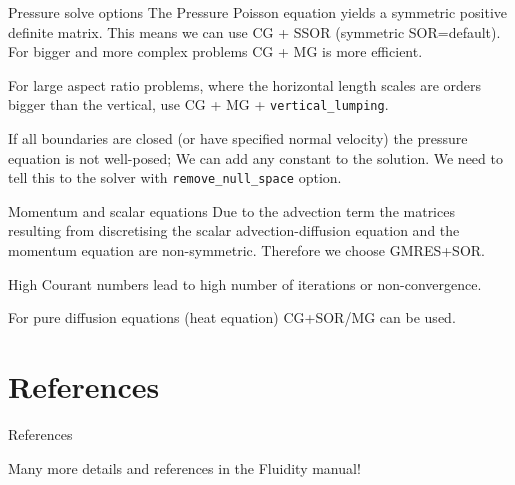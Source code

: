 \documentclass[12pt]{beamer}
\begin{document}
\begin{frame}{Pressure solve options}
  The Pressure Poisson equation yields a symmetric positive definite matrix.
  This means we can use CG + SSOR (symmetric SOR=default). For bigger and more
  complex problems CG + MG is more efficient.

  \vspace{1em}
  For large aspect ratio problems, where the horizontal length scales are orders
  bigger than the vertical, use CG + MG +
  \lstinline{vertical_lumping}.\citep{Kramer2010}

  \vspace{1em}
  If all boundaries are closed (or have specified normal velocity)
  the pressure equation is not well-posed; We can add any constant to the
  solution. We need to tell this to the solver with \lstinline{remove_null_space}
  option.
\end{frame}

\begin{frame}{Momentum and scalar equations}
  Due to the advection term the matrices resulting from discretising the scalar
  advection-diffusion equation and the momentum equation are non-symmetric.
  Therefore we choose GMRES+SOR.

  \vspace{1em}
  High Courant numbers lead to high number of iterations or non-convergence.

  \vspace{1em}
  For pure diffusion equations (heat equation) CG+SOR/MG can be used.
\end{frame}

\section{References}
\begin{frame}{References}
  \tiny
  
  
  \normalsize Many more details and references in the Fluidity manual!
\end{frame}
\end{document}
